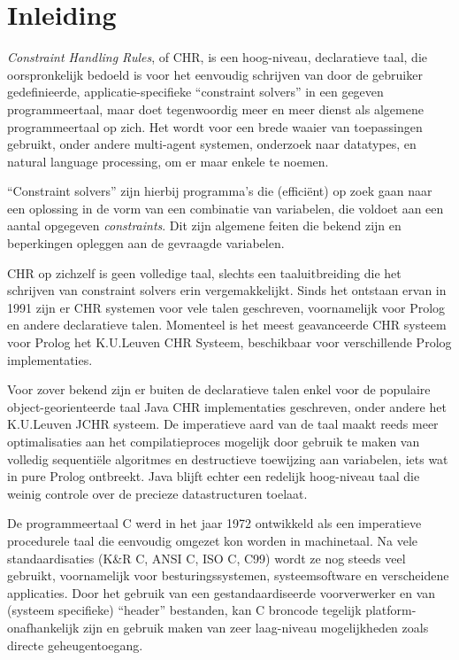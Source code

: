 \chapter{Inleiding}
\label{chap:inleiding}

{\em Constraint Handling Rules}, of CHR, is een hoog-niveau, declaratieve taal, die oorspronkelijk bedoeld is voor het eenvoudig schrijven van door de gebruiker gedefinieerde, applicatie-specifieke ``constraint solvers'' in een gegeven programmeertaal, maar doet tegenwoordig meer en meer dienst als algemene programmeertaal op zich. Het wordt voor een brede waaier van toepassingen gebruikt, onder andere multi-agent systemen, onderzoek naar datatypes, en natural language processing, om er maar enkele te noemen.

``Constraint solvers'' zijn hierbij programma's die (effici\"ent) op zoek gaan naar een oplossing in de vorm van een combinatie van variabelen, die voldoet aan een aantal opgegeven {\em constraints}. Dit zijn algemene feiten die bekend zijn en beperkingen opleggen aan de gevraagde variabelen.

CHR op zichzelf is geen volledige taal, slechts een taaluitbreiding die het schrijven van constraint solvers erin vergemakkelijkt. Sinds het ontstaan ervan in 1991 zijn er CHR systemen voor vele talen geschreven, voornamelijk voor Prolog en andere declaratieve talen. Momenteel is het meest geavanceerde CHR systeem voor Prolog het K.U.Leuven CHR Systeem, beschikbaar voor verschillende Prolog implementaties. 

Voor zover bekend zijn er buiten de declaratieve talen enkel voor de populaire object-georienteerde taal Java CHR implementaties geschreven, onder andere het K.U.Leuven JCHR systeem. De imperatieve aard van de taal maakt reeds meer optimalisaties aan het compilatieproces mogelijk door gebruik te maken van volledig sequenti\"ele algoritmes en destructieve toewijzing aan variabelen, iets wat in pure Prolog ontbreekt. Java blijft echter een redelijk hoog-niveau taal die weinig controle over de precieze datastructuren toelaat.

De programmeertaal C werd in het jaar 1972 ontwikkeld als een imperatieve procedurele taal die eenvoudig omgezet kon worden in machinetaal. Na vele standaardisaties (K\&R C, ANSI C, ISO C, C99) wordt ze nog steeds veel gebruikt, voornamelijk voor besturingssystemen, systeemsoftware en verscheidene applicaties. Door het gebruik van een gestandaardiseerde voorverwerker en van (systeem specifieke) ``header'' bestanden, kan C broncode tegelijk platform-onafhankelijk zijn en gebruik maken van zeer laag-niveau mogelijkheden zoals directe geheugentoegang.

